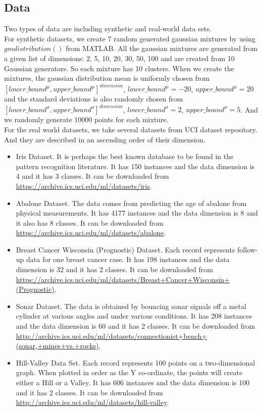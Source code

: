 \documentclass[11pt]{article}
\begin{document}
\subsection{Data}
Two types of data are including synthetic and real-world data sets.\\
For synthetic datasets, we create 7 random generated gaussian mixtures by using $gmdistribution()$ from MATLAB. All the gaussian mixtures are generated from a given list of dimensions: 2, 5, 10, 20, 30, 50, 100 and are created from 10 Gaussian generators. So each mixture has 10 clusters. When we create the mixtures, the gaussian distribution mean is uniformly chosen from $[lower\_bound^{\mu}, upper\_bound^{\mu}]^{dimension}$, $lower\_bound^{\mu}=-20$, $upper\_bound^{\mu}=20$ and the standard deviations is also randomly chosen from $[lower\_bound^{\sigma}, upper\_bound^{\sigma}]^{dimension}$, $lower\_bound^{\sigma}=2$, $upper\_bound^{\sigma}=5$. And we randomly generate 10000 points for each mixture.\\
For the real world datasets, we take several datasets from UCI dataset repository. And they are described in an ascending order of their dimension.
\begin{itemize}
\item Iris Dataset. It is perhaps the best known database to be found in the pattern recognition literature. It has 150 instances and the data dimension is 4 and it has 3 classes. It can be downloaded from \url{https://archive.ics.uci.edu/ml/datasets/iris}.
\item Abalone Dataset. The data comes from predicting the age of abalone from physical measurements. It has 4177 instances and the data dimension is 8 and it also has 8 classes. It can be downloaded from \url{https://archive.ics.uci.edu/ml/datasets/abalone}.
\item Breast Cancer Wisconsin (Prognostic) Dataset. Each record represents follow-up data for one breast cancer case. It has 198 instances and the data dimension is 32 and it has 2 classes. It can be downloaded from \url{https://archive.ics.uci.edu/ml/datasets/Breast+Cancer+Wisconsin+(Prognostic)}.
\item Sonar Dataset. The data is obtained by bouncing sonar signals off a metal cylinder at various angles and under various conditions. It has 208 instances and the data dimension is 60 and it has 2 classes. It can be downloaded from \url{http://archive.ics.uci.edu/ml/datasets/connectionist+bench+(sonar,+mines+vs.+rocks)}.
\item Hill-Valley Data Set. Each record represents 100 points on a two-dimensional graph. When plotted in order as the Y co-ordinate, the points will create either a Hill or a Valley. It has 606 instances and the data dimension is 100 and it has 2 classes. It can be downloaded from \url{http://archive.ics.uci.edu/ml/datasets/hill-valley}.
\end{itemize}
\end{document}
